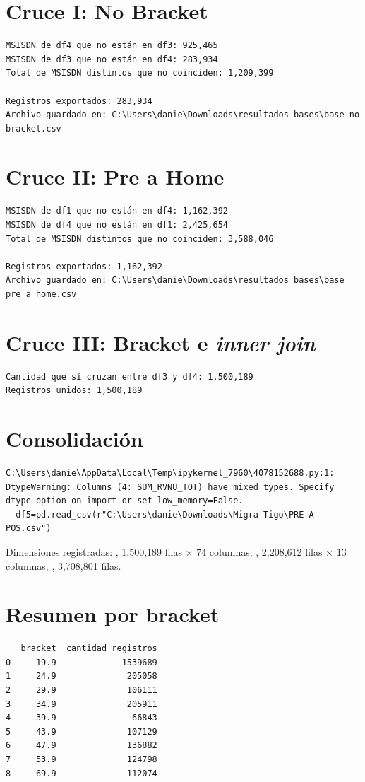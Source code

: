 \documentclass[11pt,a4paper,oneside]{book}
\DeclareRobustCommand{\cod}[1]{\texttt{\detokenize{#1}}}
\begin{document}
\section{Cruce I: No Bracket}
\begin{verbatim}
MSISDN de df4 que no están en df3: 925,465
MSISDN de df3 que no están en df4: 283,934
Total de MSISDN distintos que no coinciden: 1,209,399

Registros exportados: 283,934
Archivo guardado en: C:\Users\danie\Downloads\resultados bases\base no bracket.csv
\end{verbatim}

\section{Cruce II: Pre a Home}
\begin{verbatim}
MSISDN de df1 que no están en df4: 1,162,392
MSISDN de df4 que no están en df1: 2,425,654
Total de MSISDN distintos que no coinciden: 3,588,046

Registros exportados: 1,162,392
Archivo guardado en: C:\Users\danie\Downloads\resultados bases\base pre a home.csv
\end{verbatim}

\section{Cruce III: Bracket e \emph{inner join}}
\begin{verbatim}
Cantidad que sí cruzan entre df3 y df4: 1,500,189
Registros unidos: 1,500,189
\end{verbatim}

\section{Consolidación}
\begin{verbatim}
C:\Users\danie\AppData\Local\Temp\ipykernel_7960\4078152688.py:1: DtypeWarning: Columns (4: SUM_RVNU_TOT) have mixed types. Specify dtype option on import or set low_memory=False.
  df5=pd.read_csv(r"C:\Users\danie\Downloads\Migra Tigo\PRE A POS.csv")
\end{verbatim}

Dimensiones registradas: \cod{df_merge}, 1,500,189 filas $\times$ 74 columnas; \cod{df_nuevo}, 2,208,612 filas $\times$ 13 columnas; \cod{df_final}, 3,708,801 filas.

\section{Resumen por bracket}
\begin{verbatim}
   bracket  cantidad_registros
0     19.9             1539689
1     24.9              205058
2     29.9              106111
3     34.9              205911
4     39.9               66843
5     43.9              107129
6     47.9              136882
7     53.9              124798
8     69.9              112074
\end{verbatim}
\end{document}
